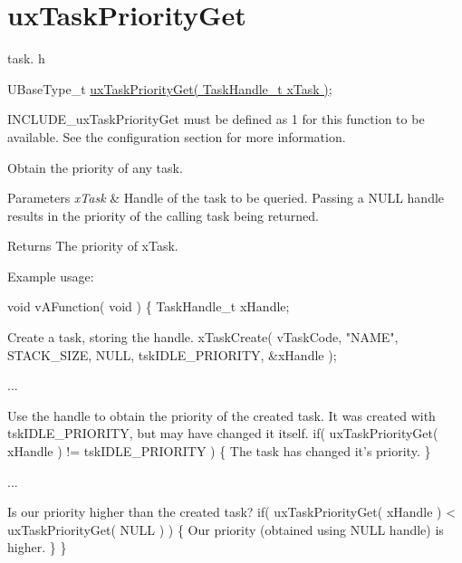 \hypertarget{group__uxTaskPriorityGet}{\section{ux\-Task\-Priority\-Get}
\label{group__uxTaskPriorityGet}
}
task. h 
\begin{DoxyPre}UBaseType\_t \hyperlink{task_8h_a3edc3f1a0adc8403f42529bce4ae3446}{uxTaskPriorityGet( TaskHandle\_t xTask )};\end{DoxyPre}


I\-N\-C\-L\-U\-D\-E\-\_\-ux\-Task\-Priority\-Get must be defined as 1 for this function to be available. See the configuration section for more information.

Obtain the priority of any task.


\begin{DoxyParams}{Parameters}
{\em x\-Task} & Handle of the task to be queried. Passing a N\-U\-L\-L handle results in the priority of the calling task being returned.\\
\hline
\end{DoxyParams}
\begin{DoxyReturn}{Returns}
The priority of x\-Task.
\end{DoxyReturn}
Example usage\-: 
\begin{DoxyPre}
 void vAFunction( void )
 \{
 TaskHandle\_t xHandle;\end{DoxyPre}



\begin{DoxyPre}Create a task, storing the handle.
     xTaskCreate( vTaskCode, "NAME", STACK\_SIZE, NULL, tskIDLE\_PRIORITY, \&xHandle );\end{DoxyPre}



\begin{DoxyPre}...\end{DoxyPre}



\begin{DoxyPre}Use the handle to obtain the priority of the created task.
It was created with tskIDLE\_PRIORITY, but may have changed
it itself.
     if( uxTaskPriorityGet( xHandle ) != tskIDLE\_PRIORITY )
     \{
The task has changed it's priority.
     \}\end{DoxyPre}



\begin{DoxyPre}...\end{DoxyPre}



\begin{DoxyPre}Is our priority higher than the created task?
     if( uxTaskPriorityGet( xHandle ) < uxTaskPriorityGet( NULL ) )
     \{
Our priority (obtained using NULL handle) is higher.
     \}
 \}
   \end{DoxyPre}
 